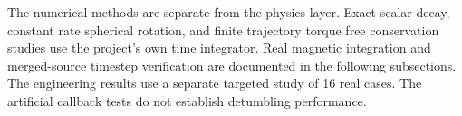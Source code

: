 The numerical methods are separate from the physics layer. Exact scalar decay, constant rate spherical rotation, and finite trajectory torque free conservation studies use the project's own time integrator. Real magnetic integration and merged-source timestep verification are documented in the following subsections. The engineering results use a separate targeted study of 16 real cases. The artificial callback tests do not establish detumbling performance.
